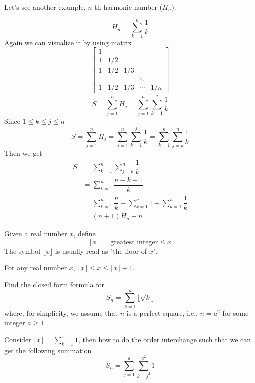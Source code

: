 Let's see another example, \(n\)-th harmonic number (\(H_n\)).

\begin{eg}
	\[
		H_n = \sum_{k = 1}^n \dfrac{1}{k}
	\]
	Again we can visualize it by using matrix
	\[
		\begin{bmatrix}
			1 &  &  &  &   \\
			1 & 1/2 &  &  &   \\
			1 & 1/2 & 1/3 &  &   \\
			  &  &  & \ddots &   \\
			1 & 1/2 & 1/3 & \cdots &1/n
		\end{bmatrix}
	\]
	\[
		S = \sum_{j = 1}^n H_j = \sum_{j = 1}^n  \sum_{k = 1}^j \dfrac{1}{k} 
	\]
	Since \(1 \leq k \leq j \leq n\) 
	\[
		S = \sum_{j = 1}^n H_j = \sum_{j = 1}^n  \sum_{k = 1}^j \dfrac{1}{k} = \sum_{k = 1}^n  \sum_{j = k}^n \dfrac{1}{k}
	\]
	Then we get
	\[
		\begin{aligned}
			S &= \sum_{k = 1}^n  \sum_{j = k}^n \dfrac{1}{k} \\
			&= \sum_{k = 1}^n \dfrac{n - k + 1}{k} \\
			&= \sum_{k = 1}^n \dfrac{n}{k} - \sum_{k = 1}^n 1 + \sum_{k = 1}^n \dfrac{1}{k} \\
			&= (n+1)H_n - n
		\end{aligned}
	\]
\end{eg}

\begin{definition}
	Given a real number \(x\), define
	\[
		\lfloor x \rfloor =\ \text{greatest integer} \leq x
	\]
	The symbol \(\lfloor x \rfloor\) is usually read as "the floor of \(x\)".
\end{definition}
\newpage

\begin{exercise}
	For any real number \(x\), \(\lfloor x \rfloor \leq  x \leq  \lfloor x \rfloor + 1\).

	Find the closed form formula for 
	\[
		S_n = \sum_{k = 1}^n \lfloor\sqrt{k}\rfloor
	\]
	where, for simplicity, we assume that \(n\) is a perfect square, i.e., \(n = a^2\) for some integer \(a \geq 1\). 
	\begin{remark}
		Consider \(\lfloor x \rfloor = \sum_{k = 1}^x 1\), then how to do the order interchange such that we can get the following summation 
		\[
			S_n = \sum_{j = 1}^a \sum_{k = j^2}^{a^2} 1
		\]
	\end{remark}
\end{exercise}

